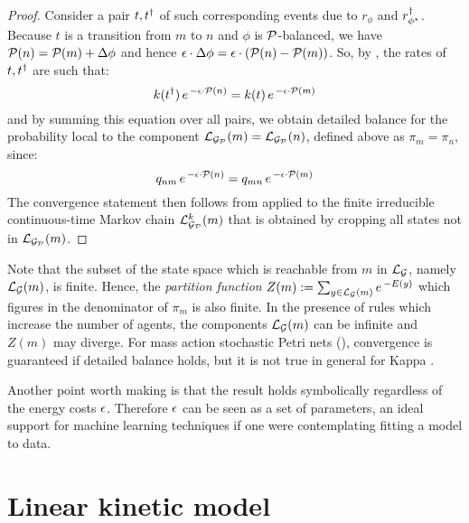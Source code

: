 \begin{proof}
  Consider a pair $t,t^\dagger$ of such corresponding events
  due to $r_\phi$ and $r^\dagger_{\phi^\star}$.
  Because $t$ is a transition from $m$ to $n$
  and $\phi$ is $\mathcal{P}$-balanced, %
  we have $\mathcal{P}(n) = \mathcal{P}(m) + \Delta\phi$
  and hence
  $\epsilon \cdot \Delta\phi = \epsilon \cdot (\mathcal{P}(n)-\mathcal{P}(m))$.
  So, by , the rates of $t,t^\dagger$ are such that:
  \begin{equation*}
    k(t^\dagger)\, e^{\,-\epsilon \cdot \mathcal{P}(n)} =
    k(t)\, e^{\,-\epsilon \cdot \mathcal{P}(m)}
  \end{equation*}
  and by summing this equation over all pairs,
  we obtain detailed balance
  for the probability local to the component
  $\mathcal{L}_{\mathcal{G}_{\mathcal{P}}}(m) = \mathcal{L}_{\mathcal{G}_{\mathcal{P}}}(n)$,
  defined above as $\pi_m = \pi_n$, since:
  \begin{equation*}
    q_{nm}\, e^{\,-\epsilon \cdot \mathcal{P}(n)} =
    q_{mn}\, e^{\,-\epsilon \cdot \mathcal{P}(m)}
  \end{equation*}
  The convergence statement then follows from 
  applied to the finite irreducible continuous-time Markov chain
  $\mathcal{L}^k_{\mathcal{G}_{\mathcal{P}}}(m)$
  that is obtained by cropping all states
  not in $\mathcal{L}_{\mathcal{G}_{\mathcal{P}}}(m)$.
\end{proof}

Note that the subset of the state space
which is reachable from $m$ in $\mathcal{L}_{\mathcal{G}}$,
namely $\mathcal{L}_{\mathcal{G}}(m)$, is finite.
Hence, the \emph{partition function}
$Z(m) := \sum_{y \in \mathcal{L}_{\mathcal{G}}(m)} e^{\,-E(y)}$
which figures in the denominator of $\pi_m$ is also finite.
In the presence of rules which increase the number of agents,
the components $\mathcal{L}_{\mathcal{G}}(m)$ can be infinite
and $Z(m)$ may diverge.
For mass action stochastic Petri nets (),
convergence is guaranteed if detailed balance holds,
but it is not true in general for Kappa \citep{et2,et1}.

Another point worth making is that the result holds symbolically %
regardless of the energy costs $\epsilon$.
Therefore $\epsilon$ can be seen as a set of parameters,
an ideal support for machine learning techniques
if one were contemplating fitting a model to data.


\section{Linear kinetic model}
\label{sec:kinetic-model}

